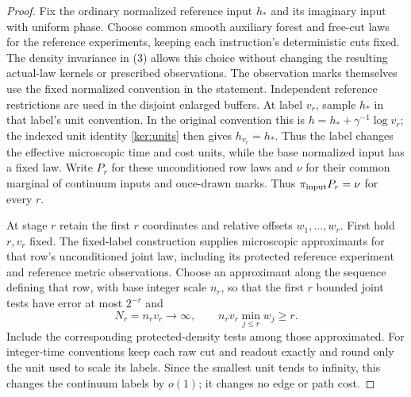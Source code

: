 \documentclass[11pt]{article}
\numberwithin{equation}{section}
\theoremstyle{definition}
\theoremstyle{remark}
\newcommand{\1}{\mathbf 1}
\begin{document}
\begin{proof}
Fix the ordinary normalized reference input
\(h_*\) and its imaginary input with uniform phase. Choose common
smooth auxiliary forest and free-cut laws for the reference
experiments, keeping each instruction's deterministic cuts fixed.
The density invariance in (3)
allows this choice without changing the resulting actual-law kernels
or prescribed observations. The observation marks themselves use the
fixed normalized convention in the statement. Independent reference restrictions
are used in the disjoint enlarged buffers.  At label \(v_r\), sample
\(h_*\) in that label's unit convention.  In the original convention
this is \(h=h_*+\gamma^{-1}\log v_r\); the indexed unit identity
\eqref{ker:units} then gives \(h_{v_r}=h_*\).  Thus the label changes
the effective microscopic time and cost units, while the base
normalized input has a fixed law.
Write \(P_r\) for these unconditioned row laws and \(\nu\) for
their common marginal of continuum inputs and once-drawn marks.
Thus \(\pi_{\rm input}P_r=\nu\) for every \(r\).

At stage \(r\) retain the first \(r\) coordinates and relative
offsets \(w_1,\ldots,w_r\).  First hold \(r,v_r\) fixed.  The
fixed-label construction supplies microscopic approximants for that
row's unconditioned joint law, including its protected reference
experiment and reference metric observations.  Choose an approximant
along the sequence defining that row, with base integer scale
\(n_r\), so that the first \(r\) bounded joint
tests have error at most \(2^{-r}\) and
\[
 N_r=n_rv_r\longrightarrow\infty,\qquad
 n_rv_r\min_{j\le r}w_j\ge r.
\]
Include the corresponding protected-density tests among those
approximated.  For integer-time conventions keep each raw cut and readout exactly and
round only the unit used to scale its labels.  Since the smallest
unit tends to infinity, this changes the continuum labels by
\(o(1)\); it changes no edge or path cost.


\end{proof}
\end{document}

